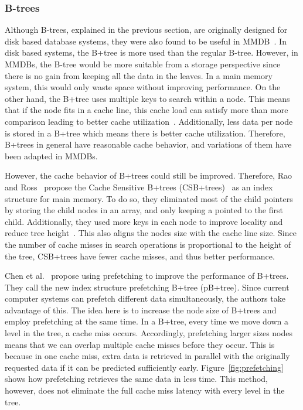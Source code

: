 \documentclass[12pt,a4paper]{article}
\begin{document}
\subsubsection*{B-trees}
Although B-trees, explained in the previous section, are originally designed for disk based database systems, they were also found to be useful in
MMDB~\cite{lehman1986study}. In disk based systems, the B+tree is more used than the regular B-tree. However, in MMDBs, the B-tree would be
more suitable from a storage perspective since there is no gain from keeping all the data in the leaves. In a main memory system, this
would only waste space without improving performance. On the other hand, the B+tree uses multiple keys to search within a node. This means that
if the node fits in a cache line, this cache load can satisfy more than more comparison leading to better cache utilization~\cite{rao1999cache}. Additionally,
less data per node is stored in a B+tree which means there is better cache utilization. Therefore, B+trees in general have reasonable cache behavior, and
variations of them have been adapted in MMDBs.

However, the cache behavior of B+trees could still be improved. Therefore, Rao and Ross~\cite{rao2000making} propose the Cache Sensitive B+trees
(CSB+trees)~\cite{rao2000making} as an index structure for main memory. To do so, they eliminated most of the child pointers by storing the child nodes
in an array, and only keeping a pointed to the first child. Additionally, they used more keys in each
node to improve locality and reduce tree height~\cite{luan2009prefetching}. This also aligns the nodes size with the cache line size. Since the number of cache
misses in search operations is proportional to the height
of the tree, CSB+trees have fewer cache misses, and thus better performance.

Chen et al.~\cite{chen2001improving} propose using prefetching to improve the performance of B+trees. They call the new index structure prefetching B+tree
(pB+tree). Since current computer systems can prefetch different data simultaneously, the authors take advantage of this. The idea here is to increase the node
size of B+trees and employ prefetching at the same time. In a B+tree, every time we move down a level in the tree, a cache miss occurs. Accordingly,
prefetching larger sizes nodes means that we can overlap multiple cache misses before they occur. This is because in one cache miss, extra data is retrieved in
parallel with the originally requested data if it can be predicted sufficiently early. Figure~\ref{fig:prefetching} shows how prefetching retrieves the same
data in less time. This method, however, does not eliminate the full cache miss latency with every level in the tree.
\end{document}
